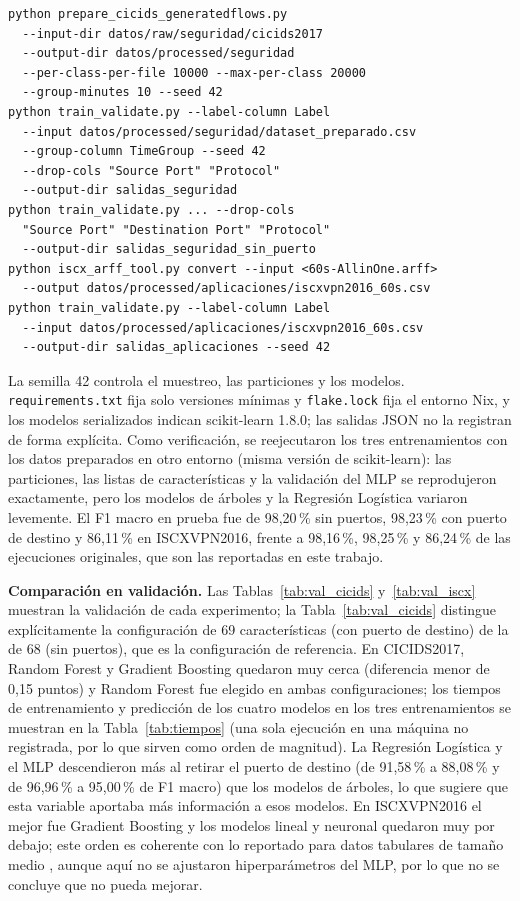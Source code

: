 \documentclass[conference]{IEEEtran}
\begin{document}
\begin{lstlisting}
python prepare_cicids_generatedflows.py
  --input-dir datos/raw/seguridad/cicids2017
  --output-dir datos/processed/seguridad
  --per-class-per-file 10000 --max-per-class 20000
  --group-minutes 10 --seed 42
python train_validate.py --label-column Label
  --input datos/processed/seguridad/dataset_preparado.csv
  --group-column TimeGroup --seed 42
  --drop-cols "Source Port" "Protocol"
  --output-dir salidas_seguridad
python train_validate.py ... --drop-cols
  "Source Port" "Destination Port" "Protocol"
  --output-dir salidas_seguridad_sin_puerto
python iscx_arff_tool.py convert --input <60s-AllinOne.arff>
  --output datos/processed/aplicaciones/iscxvpn2016_60s.csv
python train_validate.py --label-column Label
  --input datos/processed/aplicaciones/iscxvpn2016_60s.csv
  --output-dir salidas_aplicaciones --seed 42
\end{lstlisting}

La semilla 42 controla el muestreo, las particiones y los modelos. \texttt{requirements.txt} fija solo versiones mínimas y \texttt{flake.lock} fija el entorno Nix, y los modelos serializados indican scikit-learn 1.8.0; las salidas JSON no la registran de forma explícita. Como verificación, se reejecutaron los tres entrenamientos con los datos preparados en otro entorno (misma versión de scikit-learn): las particiones, las listas de características y la validación del MLP se reprodujeron exactamente, pero los modelos de árboles y la Regresión Logística variaron levemente. El F1 macro en prueba fue de 98,20\,\% sin puertos, 98,23\,\% con puerto de destino y 86,11\,\% en ISCXVPN2016, frente a 98,16\,\%, 98,25\,\% y 86,24\,\% de las ejecuciones originales, que son las reportadas en este trabajo.

\textbf{Comparación en validación.} Las Tablas~\ref{tab:val_cicids} y~\ref{tab:val_iscx} muestran la validación de cada experimento; la Tabla~\ref{tab:val_cicids} distingue explícitamente la configuración de 69 características (con puerto de destino) de la de 68 (sin puertos), que es la configuración de referencia. En CICIDS2017, Random Forest y Gradient Boosting quedaron muy cerca (diferencia menor de 0,15 puntos) y Random Forest fue elegido en ambas configuraciones; los tiempos de entrenamiento y predicción de los cuatro modelos en los tres entrenamientos se muestran en la Tabla~\ref{tab:tiempos} (una sola ejecución en una máquina no registrada, por lo que sirven como orden de magnitud). La Regresión Logística y el MLP descendieron más al retirar el puerto de destino (de 91,58\,\% a 88,08\,\% y de 96,96\,\% a 95,00\,\% de F1 macro) que los modelos de árboles, lo que sugiere que esta variable aportaba más información a esos modelos. En ISCXVPN2016 el mejor fue Gradient Boosting y los modelos lineal y neuronal quedaron muy por debajo; este orden es coherente con lo reportado para datos tabulares de tamaño medio \cite{grinsztajn2022}, aunque aquí no se ajustaron hiperparámetros del MLP, por lo que no se concluye que no pueda mejorar.
\end{document}
